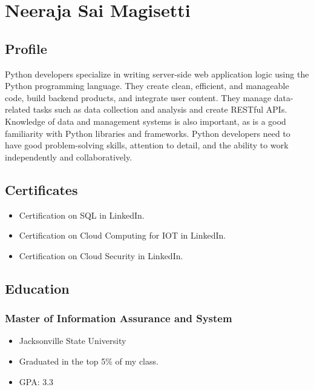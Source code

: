\documentclass[
  16,
]{article}
\author{}
\date{}
\providecommand{\tightlist}{%
  \setlength{\itemsep}{0pt}\setlength{\parskip}{0pt}}\usepackage{longtable,booktabs,array}
\begin{document}
\section{Neeraja Sai Magisetti}\label{neeraja-sai-magisetti}

\subsection{Profile}\label{profile}

Python developers specialize in writing server-side web application
logic using the Python programming language. They create clean,
efficient, and manageable code, build backend products, and integrate
user content. They manage data-related tasks such as data collection and
analysis and create RESTful APIs. Knowledge of data and management
systems is also important, as is a good familiarity with Python
libraries and frameworks. Python developers need to have good
problem-solving skills, attention to detail, and the ability to work
independently and collaboratively.

\subsection{Certificates}\label{certificates}

\begin{itemize}
\tightlist
\item
  Certification on SQL in LinkedIn.
\item
  Certification on Cloud Computing for IOT in LinkedIn.
\item
  Certification on Cloud Security in LinkedIn.
\end{itemize}

\subsection{Education}\label{education}

\subsubsection{Master of Information Assurance and
System}\label{master-of-information-assurance-and-system}

\begin{itemize}
\tightlist
\item
  Jacksonville State University
\item
  Graduated in the top 5\% of my class.
\item
  GPA: 3.3
\end{itemize}
\end{document}

